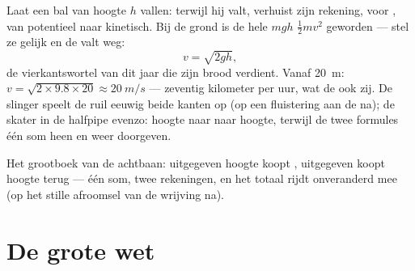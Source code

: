 \begin{example}\label{ex:g9:energy-conversions:trade}
Laat een bal van hoogte $h$ vallen: terwijl hij valt, verhuist zijn
rekening,  voor , van potentieel naar
kinetisch. Bij de grond is de hele $m g h$ $\frac12 m v^2$ geworden ---
stel ze gelijk en de  valt weg:
\[
v = \sqrt{2 g h},
\]
de vierkantswortel van dit jaar die zijn brood verdient. Vanaf
\qty{20}{m}: $v = \sqrt{2 \times 9.8 \times 20} \approx \qty{20}{m/s}$
--- zeventig kilometer per uur, wat de  ook zij. De
slinger speelt de ruil eeuwig beide kanten op (op een fluistering aan de
 na); de skater in de halfpipe evenzo: hoogte naar
 naar hoogte, terwijl de twee formules één som heen en
weer doorgeven.
\end{example}

\begin{omfigure}

{\small Het grootboek van de achtbaan: uitgegeven hoogte koopt
, uitgegeven  koopt hoogte terug
--- één som, twee rekeningen, en het totaal rijdt onveranderd mee (op
het stille afroomsel van de wrijving na).}
\end{omfigure}

\section{De grote wet}

